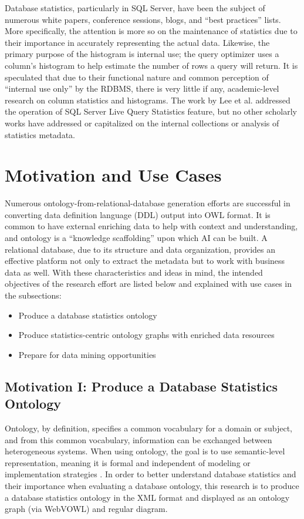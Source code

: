 \documentclass[sigconf]{acmart}
\begin{document}
Database statistics, particularly in SQL Server, have been the subject of numerous white papers, conference sessions, blogs, and “best practices” lists. More specifically, the attention is more so on the maintenance of statistics due to their importance in accurately representing the actual data. Likewise, the primary purpose of the histogram is internal use; the query optimizer uses a column’s histogram to help estimate the number of rows a query will return. It is speculated that due to their functional nature and common perception of “internal use only” by the RDBMS, there is very little if any, academic-level research on column statistics and histograms. The work by Lee et al. \cite{lee2016operator} addressed the operation of SQL Server Live Query Statistics feature, but no other scholarly works have addressed or capitalized on the internal collections or analysis of statistics metadata.

\section{Motivation and Use Cases}
Numerous ontology-from-relational-database generation efforts are successful in converting data definition language (DDL) output into OWL format. It is common to have external enriching data to help with context and understanding, and ontology is a “knowledge scaffolding” upon which AI can be built. A relational database, due to its structure and data organization, provides an effective platform not only to extract the metadata but to work with business data as well. With these characteristics and ideas in mind, the intended objectives of the research effort are listed below and explained with use cases in the subsections:

\begin{itemize}
	\item Produce a database statistics ontology
	\item Produce statistics-centric ontology graphs with enriched data resources
	\item Prepare for data mining opportunities
\end{itemize}

\subsection{Motivation I: Produce a Database Statistics Ontology}
Ontology, by definition, specifies a common vocabulary for a domain or subject, and
from this common vocabulary, information can be exchanged between heterogeneous systems. When using ontology, the goal is to use semantic-level representation, meaning it is formal and independent of modeling or implementation strategies \cite{gruber}. In order to better understand database statistics and their importance when evaluating a database ontology, this research is to produce a database statistics ontology in the XML format and displayed as an ontology graph (via WebVOWL) and regular diagram.
\end{document}
